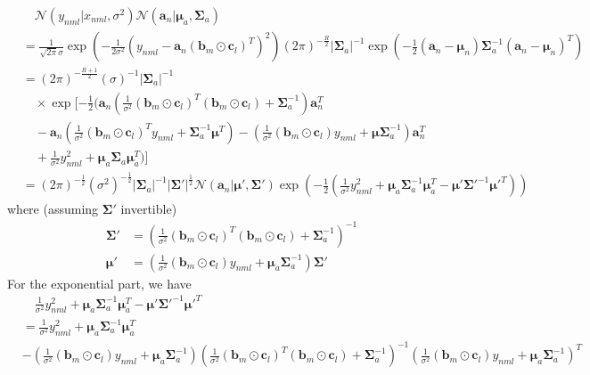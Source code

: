 \documentclass{article}
\newcommand{\bs}[1]{\boldsymbol{#1}}
\newcommand{\gs}[3]{\mathcal{N}(#1|#2,#3)}
\begin{document}
\begin{flushleft}
\begin{equation}
	\begin{split}
		& \quad \gs{y_{nml}}{x_{nml}}{\sigma^2} \gs{\bs{a}_n}{\bs{\mu}_a}{\bs{\Sigma}_a}\\
		& = \frac{1}{\sqrt{2\pi}\sigma}\exp \left(-\frac{1}{2\sigma^2} (y_{nml} - \bs{a}_n(\bs{b}_m \odot \bs{c}_l)^T)^2 \right) (2\pi)^{-\frac{R}{2}}|\bs{\Sigma}_a|^{-1} \exp \left( -\frac{1}{2} (\bs{a}_n - \bs{\mu}_n) \bs{\Sigma}_a^{-1} (\bs{a}_n - \bs{\mu}_n)^T \right)\\
		& = (2\pi)^{-\frac{R+1}{2}}(\sigma)^{-1}|\bs{\Sigma}_a|^{-1}\\
		& \quad \times \exp[-\frac{1}{2}( \bs{a}_n (\frac{1}{\sigma^2}(\bs{b}_m \odot \bs{c}_l)^T(\bs{b}_m \odot \bs{c}_l) + \bs{\Sigma}_a^{-1}) \bs{a}_n^T \\
		& \quad - \bs{a}_n(\frac{1}{\sigma^2} (\bs{b}_m \odot \bs{c}_l)^T y_{nml} + \bs{\Sigma}_a^{-1} \bs{\mu}^T) - (\frac{1}{\sigma^2} (\bs{b}_m \odot \bs{c}_l) y_{nml} + \bs{\mu} \bs{\Sigma}_a^{-1}) \bs{a}_n^T \\
		& \quad + \frac{1}{\sigma^2} y_{nml}^2 + \bs{\mu}_a \bs{\Sigma}_a \bs{\mu}_a^T )]\\
		& = (2\pi)^{-\frac{1}{2}}(\sigma^2)^{-\frac{1}{2}}|\bs{\Sigma}_a|^{-1}|\bs{\Sigma}'|^{\frac{1}{2}} \gs{\bs{a}_n}{\bs{\mu}'}{\bs{\Sigma}'}
		\exp(-\frac{1}{2}(\frac{1}{\sigma^2}y_{nml}^2 + \bs{\mu}_a \bs{\Sigma}_a^{-1} \bs{\mu}_a^T - \bs{\mu}' \bs{\Sigma}'^{-1} \bs{\mu}'^T))
	\end{split}
\end{equation}
where (assuming $\bs{\Sigma}'$ invertible)
\begin{align}
	\bs{\Sigma}' & = (\frac{1}{\sigma^2}(\bs{b}_m \odot \bs{c}_l)^T(\bs{b}_m \odot \bs{c}_l) + \bs{\Sigma}_a^{-1})^{-1} \\
	\bs{\mu}' & = (\frac{1}{\sigma^2} (\bs{b}_m \odot \bs{c}_l) y_{nml} + \bs{\mu}_a \bs{\Sigma}_a^{-1})\bs{\Sigma}'
\end{align}
For the exponential part, we have 
\begin{equation}
	\begin{split}
		& \quad \frac{1}{\sigma^2}y_{nml}^2 + \bs{\mu}_a \bs{\Sigma}_a^{-1} \bs{\mu}_a^T - \bs{\mu}' \bs{\Sigma}'^{-1} \bs{\mu}'^T \\
		& = \frac{1}{\sigma^2} y_{nml}^2 + \bs{\mu}_a \bs{\Sigma}_a^{-1} \bs{\mu}_a^T\\
		& - (\frac{1}{\sigma^2} (\bs{b}_m \odot \bs{c}_l) y_{nml} + \bs{\mu}_a \bs{\Sigma}_a^{-1}) (\frac{1}{\sigma^2}(\bs{b}_m \odot \bs{c}_l)^T(\bs{b}_m \odot \bs{c}_l) + \bs{\Sigma}_a^{-1})^{-1} (\frac{1}{\sigma^2} (\bs{b}_m \odot \bs{c}_l) y_{nml} + \bs{\mu}_a \bs{\Sigma}_a^{-1})^T\\

\end{split}
\end{equation}
\end{flushleft}
\end{document}
